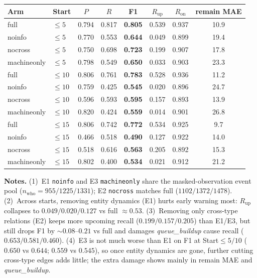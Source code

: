 \documentclass[10pt,a4paper]{article}
\begin{document}
\begin{center}
\begin{tabular}{ll S[table-format=1.3] S[table-format=1.3] S[table-format=1.3] S[table-format=1.3] S[table-format=1.3] S[table-format=2.1]}
\toprule
{Arm} & {Start} & {$P$} & {$R$} & {F1} & {$R_{\mathrm{up}}$} & {$R_{\mathrm{on}}$} & {remain MAE} \\
\midrule
full         & $\le 5$  & 0.794 & 0.817 & \bfseries 0.805 & 0.539 & 0.937 & 10.9 \\
noinfo       & $\le 5$  & 0.770 & 0.553 & \bfseries 0.644 & 0.049 & 0.899 & 19.4 \\
nocross      & $\le 5$  & 0.750 & 0.698 & \bfseries 0.723 & 0.199 & 0.907 & 17.8 \\
machineonly  & $\le 5$  & 0.798 & 0.549 & \bfseries 0.650 & 0.033 & 0.903 & 23.3 \\
\midrule
full         & $\le 10$ & 0.806 & 0.761 & \bfseries 0.783 & 0.528 & 0.936 & 11.2 \\
noinfo       & $\le 10$ & 0.759 & 0.425 & \bfseries 0.545 & 0.020 & 0.896 & 24.7 \\
nocross      & $\le 10$ & 0.596 & 0.593 & \bfseries 0.595 & 0.157 & 0.893 & 13.9 \\
machineonly  & $\le 10$ & 0.820 & 0.424 & \bfseries 0.559 & 0.014 & 0.901 & 26.8 \\
\midrule
full         & $\le 15$ & 0.806 & 0.742 & \bfseries 0.772 & 0.534 & 0.925 & 9.7 \\
noinfo       & $\le 15$ & 0.466 & 0.518 & \bfseries 0.490 & 0.127 & 0.922 & 14.0 \\
nocross      & $\le 15$ & 0.518 & 0.616 & \bfseries 0.563 & 0.205 & 0.892 & 15.3 \\
machineonly  & $\le 15$ & 0.802 & 0.400 & \bfseries 0.534 & 0.021 & 0.912 & 21.2 \\
\bottomrule
\end{tabular}
\end{center}

\small
\textbf{Notes.}
(1)~E1 \texttt{noinfo} and E3 \texttt{machineonly} share the masked-observation event pool ($n_{\mathrm{who}}{=}955/1225/1331$); E2 \texttt{nocross} matches full ($1102/1372/1478$).
(2)~Across starts, removing entity dynamics (E1) hurts early warning most: $R_{\mathrm{up}}$ collapses to $0.049/0.020/0.127$ vs full ${\approx}0.53$.
(3)~Removing only cross-type relations (E2) keeps more upcoming recall ($0.199/0.157/0.205$) than E1/E3, but still drops F1 by ${\sim}0.08$--$0.21$ vs full and damages \textit{queue\_buildup} cause recall ($0.653/0.581/0.460$).
(4)~E3 is not much worse than E1 on F1 at Start$\le5/10$ ($0.650$ vs $0.644$; $0.559$ vs $0.545$), so once entity dynamics are gone, further cutting cross-type edges adds little; the extra damage shows mainly in remain MAE and \textit{queue\_buildup}.
\end{document}
